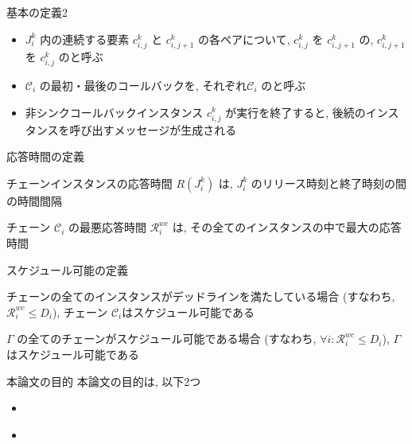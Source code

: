 \begin{frame}{基本の定義2}
    \begin{itemize}
        \item $J_{i}^{k}$ 内の連続する要素 $c_{i, j}^{k}$ と $c_{i, j+1}^{k}$ の各ペアについて, $c_{i, j}^{k}$ を $c_{i, j+1}^{k}$ の, $c_{i, j+1}^{k}$ を $c_{i, j}^{k}$ のと呼ぶ
        \item $\mathcal{C}_{i}$ の最初・最後のコールバックを, それぞれ$\mathcal{C}_{i}$ のと呼ぶ
        \item 非シンクコールバックインスタンス $c_{i, j}^{k}$ が実行を終了すると, 後続のインスタンスを呼び出すメッセージが生成される
    \end{itemize}
\end{frame}

\begin{frame}{応答時間の定義}
    \begin{definition}
        チェーンインスタンスの応答時間 $R\left(J_{i}^{k}\right)$ は,  $J_{i}^{k}$ のリリース時刻と終了時刻の間の時間間隔
    \end{definition}
    \begin{definition}
        チェーン $\mathcal{C}_{i}$ の最悪応答時間 $\mathcal{R}_{i}^{w c}$ は, その全てのインスタンスの中で最大の応答時間
    \end{definition}
\end{frame}

\begin{frame}{スケジュール可能の定義}
    \begin{definition}
        チェーンの全てのインスタンスがデッドラインを満たしている場合 (すなわち, $\mathcal{R}_{i}^{w c} \leq D_{i}$), チェーン $\mathcal{C}_{i}$はスケジュール可能である
    \end{definition}
    \begin{definition}
        $\Gamma$ の全てのチェーンがスケジュール可能である場合 (すなわち, $\forall i: \mathcal{R}_{i}^{w c} \leq D_{i}$), $\Gamma$はスケジュール可能である
    \end{definition}
\end{frame}

\begin{frame}{本論文の目的}
    本論文の目的は, 以下2つ
    \begin{itemize}
        \item {}
        \item {} \\
    \end{itemize}
\end{frame}



